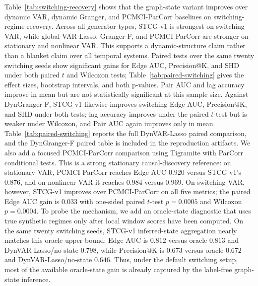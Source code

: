 \documentclass[sigconf,review,anonymous]{acmart}
\begin{document}
Table~\ref{tab:switching-recovery} shows that the graph-state variant improves over dynamic VAR, dynamic Granger, and PCMCI-ParCorr baselines on switching-regime recovery.
Across all generator types, STCG-v1 is strongest on switching VAR, while global VAR-Lasso, Granger-F, and PCMCI-ParCorr are stronger on stationary and nonlinear VAR.
This supports a dynamic-structure claim rather than a blanket claim over all temporal systems.
Paired tests over the same twenty switching seeds show significant gains for Edge AUC, Precision@K, and SHD under both paired $t$ and Wilcoxon tests; Table~\ref{tab:paired-switching} gives the effect sizes, bootstrap intervals, and both p-values.
Pair AUC and lag accuracy improve in mean but are not statistically significant at this sample size.
Against DynGranger-F, STCG-v1 likewise improves switching Edge AUC, Precision@K, and SHD under both tests; lag accuracy improves under the paired $t$-test but is weaker under Wilcoxon, and Pair AUC again improves only in mean.
Table~\ref{tab:paired-switching} reports the full DynVAR-Lasso paired comparison, and the DynGranger-F paired table is included in the reproduction artifacts.
We also add a focused PCMCI-ParCorr comparison using Tigramite with ParCorr conditional tests.
This is a strong stationary causal-discovery reference: on stationary VAR, PCMCI-ParCorr reaches Edge AUC $0.920$ versus STCG-v1's $0.876$, and on nonlinear VAR it reaches $0.984$ versus $0.969$.
On switching VAR, however, STCG-v1 improves over PCMCI-ParCorr on all five metrics; the paired Edge AUC gain is $0.033$ with one-sided paired $t$-test $p=0.0005$ and Wilcoxon $p=0.0004$.
To probe the mechanism, we add an oracle-state diagnostic that uses true synthetic regimes only after local window scores have been computed.
On the same twenty switching seeds, STCG-v1 inferred-state aggregation nearly matches this oracle upper bound: Edge AUC is $0.812$ versus oracle $0.813$ and DynVAR-Lasso/no-state $0.798$, while Precision@K is $0.673$ versus oracle $0.672$ and DynVAR-Lasso/no-state $0.646$.
Thus, under the default switching setup, most of the available oracle-state gain is already captured by the label-free graph-state inference.

\begin{table}[t]
\caption{Paired STCG-v1 versus DynVAR-Lasso tests on switching-regime recovery. Positive improvement means STCG-v1 is better; for SHD it means fewer errors. $p_t$ is the one-sided paired $t$-test and $p_W$ is the one-sided Wilcoxon signed-rank test.}
\label{tab:paired-switching}
\centering
\small
\resizebox{\linewidth}{!}{}
\end{table}
\end{document}
